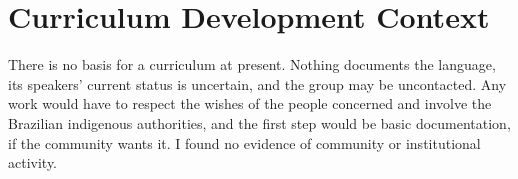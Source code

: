 \documentclass[12pt]{article}
\begin{document}
\section{Curriculum Development Context}
There is no basis for a curriculum at present. Nothing documents the language, its speakers' current status is uncertain, and the group may be uncontacted. Any work would have to respect the wishes of the people concerned and involve the Brazilian indigenous authorities, and the first step would be basic documentation, if the community wants it. I found no evidence of community or institutional activity.
\end{document}
